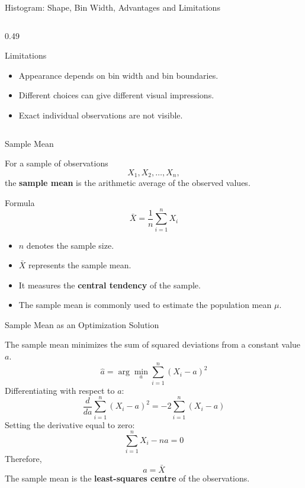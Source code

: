 \documentclass{beamer}
\begin{document}
\begin{frame}{Histogram: Shape, Bin Width, Advantages and Limitations}
\begin{columns}[T,onlytextwidth]
\begin{column}{0.49\textwidth}
\vspace{-2mm}

\begin{block}{Limitations}
\footnotesize
\begin{itemize}
    \setlength{\itemsep}{3pt}
    \item Appearance depends on bin width and bin boundaries.
    \item Different choices can give different visual impressions.
    \item Exact individual observations are not visible.
\end{itemize}
\end{block}

\end{column}

\end{columns}

\end{frame}


\begin{frame}{Sample Mean}

For a sample of observations
\[
X_1,X_2,\ldots,X_n,
\]
the \textbf{sample mean} is the arithmetic average of the
observed values.

\begin{block}{Formula}
\[
\boxed{
\bar{X}
=
\frac{1}{n}\sum_{i=1}^{n}X_i
}
\]
\end{block}

\begin{itemize}
    \item $n$ denotes the sample size.
    \item $\bar{X}$ represents the sample mean.
    \item It measures the \textbf{central tendency} of the sample.
    \item The sample mean is commonly used to estimate the population mean $\mu$.
\end{itemize}

\end{frame}


\begin{frame}{Sample Mean as an Optimization Solution}

The sample mean minimizes the sum of squared deviations
from a constant value $a$.
\[
\boxed{
\hat{a}
=
\arg\min_a
\sum_{i=1}^{n}(X_i-a)^2
}
\]
\vspace{0.1cm}
Differentiating with respect to $a$:
\[
\frac{d}{da}
\sum_{i=1}^{n}(X_i-a)^2
=
-2\sum_{i=1}^{n}(X_i-a)
\]
Setting the derivative equal to zero:
\[
\sum_{i=1}^{n}X_i-na=0
\]
Therefore,
\[
\boxed{
a=\bar{X}
}
\]
The sample mean is the \textbf{least-squares centre} of the observations.

\end{frame}
\end{document}
